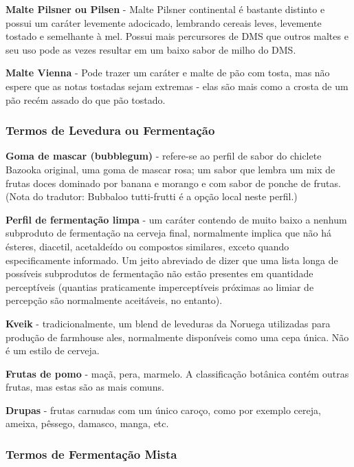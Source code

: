 \textbf{Malte Pilsner ou Pilsen} - Malte Pilsner continental é bastante distinto e possui um caráter levemente adocicado, lembrando cereais leves, levemente tostado e semelhante à mel. Possui mais percursores de DMS que outros maltes e seu uso pode as vezes resultar em um baixo sabor de milho do DMS.

\textbf{Malte Vienna} - Pode trazer um caráter e malte de pão com tosta, mas não espere que as notas tostadas sejam extremas - elas são mais como a crosta de um pão recém assado do que pão tostado.

\subsubsection*{Termos de Levedura ou Fermentação}


\textbf{Goma de mascar (bubblegum)} - refere-se ao perfil de sabor do chiclete Bazooka original, uma goma de mascar rosa; um sabor que lembra um mix de frutas doces dominado por banana e morango e com sabor de ponche de frutas.
(Nota do tradutor: Bubbaloo tutti-frutti é a opção local neste perfil.)

\textbf{Perfil de fermentação limpa} - um caráter contendo de muito baixo a nenhum subproduto de fermentação na cerveja final, normalmente implica que não há ésteres, diacetil, acetaldeído ou compostos similares, exceto quando especificamente informado. Um jeito abreviado de dizer que uma lista longa de possíveis subprodutos de fermentação não estão presentes em quantidade perceptíveis (quantias praticamente imperceptíveis próximas ao limiar de percepção são normalmente aceitáveis, no entanto).

\textbf{Kveik} - tradicionalmente, um blend de leveduras da Noruega utilizadas para produção de farmhouse ales, normalmente disponíveis como uma cepa única. Não é um estilo de cerveja.

\textbf{Frutas de pomo} - maçã, pera, marmelo. A classificação botânica contém outras frutas, mas estas são as mais comuns.

\textbf{Drupas} - frutas carnudas com um único caroço, como por exemplo cereja, ameixa, pêssego, damasco, manga, etc.

\subsubsection*{Termos de Fermentação Mista}

